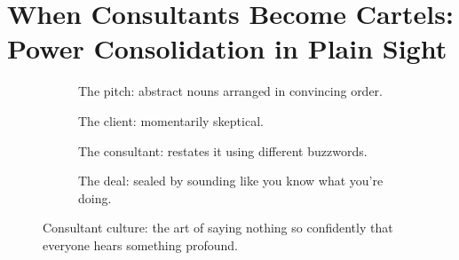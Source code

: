 \section{When Consultants Become Cartels: Power Consolidation in Plain Sight}

\begin{figure}[H]
  \centering
  
  \begin{subfigure}[t]{0.45\textwidth}
  \centering
  \caption*{The pitch: abstract nouns arranged in convincing order.}
  \end{subfigure}
  \hfill
  \begin{subfigure}[t]{0.45\textwidth}
  \centering
  \caption*{The client: momentarily skeptical.}
  \end{subfigure}
  
  \vspace{1em}
  
  \begin{subfigure}[t]{0.45\textwidth}
  \centering
  \caption*{The consultant: restates it using different buzzwords.}
  \end{subfigure}
  \hfill
  \begin{subfigure}[t]{0.45\textwidth}
  \centering
  \caption*{The deal: sealed by sounding like you know what you’re doing.}
  \end{subfigure}
  
  \caption{Consultant culture: the art of saying nothing so confidently that everyone hears something profound.}
  \end{figure}


